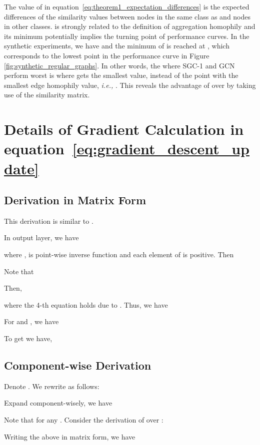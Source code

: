\documentclass{article}
\newcommand\ie{\textit{i.e.,}}
\newcommand\iid{\textit{i.i.d.}}
\newcommand{\0}{{\boldsymbol{0}}}
\newcommand{\6}{{\partial}}
\newcommand{\8}{{\infty}}
\newcommand{\4}{{\nabla}}
\def\eqref#1{equation~\ref{#1}}
\begin{document}
The value of  in \eqref{eq:theorem1_expectation_differences} is the expected differences of the similarity values between nodes in the same class as  and nodes in other classes.  is strongly related to the definition of aggregation homophily and its minimum potentially implies the turning point of performance curves. In the synthetic experiments, we have  and the minimum of  is reached at , which corresponds to the lowest point in the performance curve in Figure \ref{fig:synthetic_regular_graphs}. In other words, the  where SGC-1 and GCN perform worst is where  gets the smallest value, instead of the point with the smallest edge homophily value, \ie{} . This reveals the advantage of  over  by taking use of the similarity matrix.



\section{Details of Gradient Calculation in \eqref{eq:gradient_descent_update}}
\label{appendix:details_of_nll_loss_explanation}
\subsection{Derivation in Matrix Form} This derivation is similar to \cite{luan2020training}.

In output layer, we have

where ,  is point-wise inverse function and each element of  is positive. Then

Note that

Then,

where the  4-th equation holds due to . Thus, we have

For  and , we have

To get  we have, 


\subsection{Component-wise Derivation}
Denote . 
We rewrite  as follows:

Expand  component-wisely, we have

Note that  for any . 
Consider the derivation of  over :

Writing the above in matrix form, we have

\iffalse
\section{Proof of The Worst Case of Aggregation Similarity Score}
\label{appendix:worst_case_proof}
\begin{proof}
Suppose we have  classes, and class  has  nodes. Suppose node  is in class ,  all elements in  are \iid with expectation  and variance . Let  and . Then

since

\end{proof}
\fi
\end{document}

